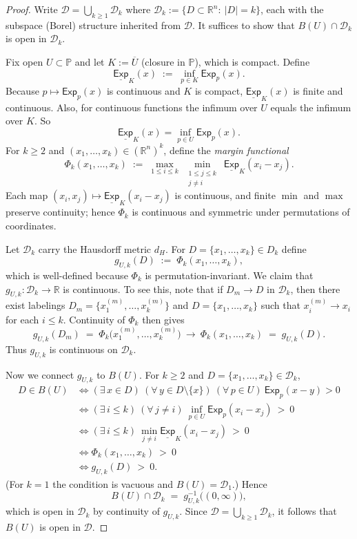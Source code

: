 \documentclass[a4paper]{article}
\renewcommand\P{\mathbb{P}} %
\newcommand\Exp{\mathsf{Exp}}
\newcommand{\Decs}{\mathcal{D}}
\newcommand{\IP}{\P}
\renewcommand{\leq}{\leqslant}
\newenvironment{CCM rewritten}
{\begingroup\color{blue}} %
{\endgroup}              %
\begin{document}
\begin{proof}
Write $\Decs=\bigcup_{k\ge1} \Decs_k$ where $\Decs_k:=\{D\subset\mathbb{R}^n:\ |D|=k\}$, each with the subspace (Borel) structure inherited from $\Decs$. It suffices to show that $B(U)\cap \Decs_k$ is open in $\Decs_k$.

Fix open $U\subset \IP$ and let $K:=\overline{U}$ (closure in $\IP$), which is compact. Define
\[
\underline{\Exp}_K(x)\;:=\;\inf_{p\in K} \Exp_{p}(x).
\]
Because $p\mapsto \Exp_{p}(x)$ is continuous and $K$ is compact, $\underline{\Exp}_K(x)$ is finite and continuous. %
Also, for continuous functions the infimum over $U$ equals the infimum over $K$. So 
\[
\underline{\Exp}_K(x)=\inf_{p\in U} \Exp_{p}(x).
\]
For $k\ge 2$ and $(x_1,\dots,x_k)\in(\mathbb{R}^n)^k$, define the \emph{margin functional}
\[
\Phi_k(x_1,\dots,x_k)\;:=\;\max_{1\le i\le k}\ \min_{\substack{1\le j\le k\\ j\ne i}}\ \underline{\Exp}_K(x_i-x_j).
\]
Each map $(x_i,x_j)\mapsto \underline{\Exp}_K(x_i-x_j)$ is continuous, and finite $\min$ and $\max$ preserve continuity; hence $\Phi_k$ is continuous and symmetric under permutations of coordinates.

Let $\Decs_k$ carry the Hausdorff metric $d_H$. For $D=\{x_1,\dots,x_k\}\in D_k$ define
\[
g_{U,k}(D)\;:=\;\Phi_k(x_1,\dots,x_k),
\]
which is well-defined because $\Phi_k$ is permutation-invariant. We claim that $g_{U,k}:\Decs_k\to\mathbb{R}$ is continuous. To see this, note that if $D_m\to D$ in $\Decs_k$, then there exist labelings $D_m=\{x_1^{(m)},\dots,x_k^{(m)}\}$ and $D=\{x_1,\dots,x_k\}$ such that $x_i^{(m)}\to x_i$ for each $i\leq k$. Continuity of $\Phi_k$ then gives
\[
g_{U,k}(D_m)\;=\;\Phi_k\big(x_1^{(m)},\dots,x_k^{(m)}\big)\ \longrightarrow\ \Phi_k(x_1,\dots,x_k)\;=\;g_{U,k}(D).
\]
Thus $g_{U,k}$ is continuous on $\Decs_k$.

Now we connect $g_{U,k}$ to $B(U)$. For $k\ge2$ and $D=\{x_1,\dots,x_k\}\in \Decs_k$,
\begin{align}
D\in B(U)
&\iff (\exists\, x\in D)\ (\forall\, y\in D\setminus\{x\})\ (\forall\, p\in U)\  \Exp_{p}(x-y)>0\\
&\iff (\exists\, i\leq k)\ (\forall\, j\ne i)\ \inf_{p\in U}  \Exp_{p}(x_i-x_j)\ >\ 0\\
&\iff  (\exists\, i\leq k)\ \min_{j\ne i}\underline{\Exp}_K(x_i-x_j)\ >\ 0\\
&\iff \Phi_k(x_1,\dots,x_k)\ >\ 0\\
&\iff g_{U,k}(D)\ >\ 0.
\end{align}
(For $k=1$ the condition is vacuous and $B(U)=\Decs_1$.) Hence
\[
B(U)\cap \Decs_k\;=\;g_{U,k}^{-1}\big((0,\infty)\big),
\]
which is open in $\Decs_k$ by continuity of $g_{U,k}$. Since $\Decs=\bigcup_{k\ge1}\Decs_k$, it follows that $B(U)$ is open in $\Decs$.
\end{proof}
\end{document}
